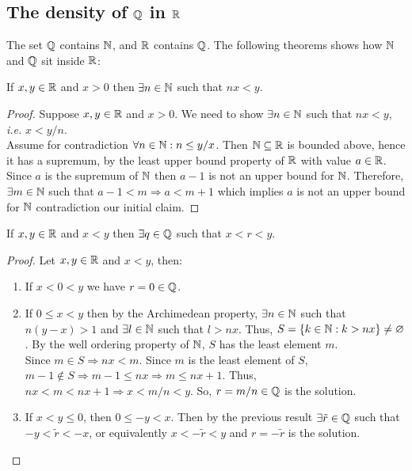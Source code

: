 \subsection{The density of $\Q$ in $\R$}

The set $\Q$ contains $\mathbb{N}$, and $\R$ contains $\Q$. The following theorems shows how $\mathbb{N}$ and $\Q$ sit inside $\R$:

\begin{theorem}
    If $x, y \in \mathbb{R}$ and $x > 0$ then $\exists n \in \mathbb{N}$ such that $nx < y$.
\end{theorem}

\begin{proof}
    Suppose $x, y \in \mathbb{R}$ and $x > 0$. We need to show $\exists n \in \mathbb{N}$ such that $nx < y$, \emph{i.e.} $x < y/n$. \\
    Assume for contradiction $\forall n \in \mathbb{N}: n \leq y/x$. Then $\mathbb{N} \subseteq \mathbb{R}$ is bounded above, hence it has a supremum, by the least upper bound property of $\R$ with value $a \in \mathbb{R}$. Since $a$ is the supremum of $\mathbb{N}$ then $a-1$ is not an upper bound for $\mathbb{N}$. Therefore, $\exists m \in \mathbb{N}$ such that $a-1 < m \Rightarrow a < m + 1$ which implies $a$ is not an upper bound for $\mathbb{N}$ contradiction our initial claim.
\end{proof}

\begin{theorem}[Densit of $\Q$ in $\R$]
    If $x, y \in \mathbb{R}$ and $x < y$ then $\exists q \in \mathbb{Q}$ such that $x < r < y$.
\end{theorem}

\begin{proof}
    Let $x, y \in \mathbb{R}$ and $x < y$, then:
    \begin{enumerate}
        \item If $x < 0 < y$ we have $r = 0 \in \mathbb{Q}$.
        \item If $0 \leq x < y$ then by the Archimedean property, $\exists n \in \mathbb{N}$ such that $n(y-x) > 1$ and $\exists l \in \mathbb{N}$ such that $l > nx$. Thus, $S = \{ k \in \mathbb{N}: k > nx\} \neq \varnothing$. By the well ordering property of $\mathbb{N}$, $S$ has the least element $m$.\\
        Since $m \in S \Rightarrow nx < m$. Since $m$ is the least element of $S$, $m-1 \notin S \Rightarrow m-1 \leq nx \Rightarrow m \leq nx + 1$. Thus, $nx < m < nx + 1 \Rightarrow x < m/n < y$. So, $r = m/n \in \mathbb{Q}$ is the solution.
        \item If $x < y \leq 0$, then $0 \leq -y < x$. Then by the previous result $\exists \tilde{r} \in \mathbb{Q}$ such that $-y < \tilde{r} < -x$, or equivalently $x < -\tilde{r} < y$ and $r = -\tilde{r}$ is the solution.
    \end{enumerate}
\end{proof}

